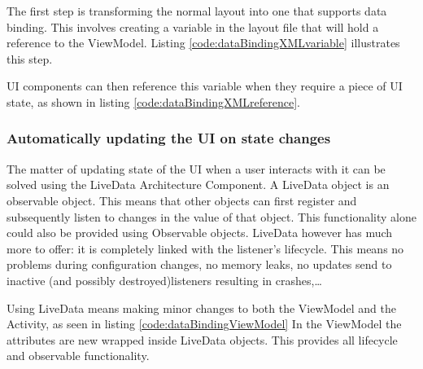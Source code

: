 The first step is transforming the normal layout into one that supports data binding.
This involves creating a variable in the layout file that will hold a reference to the ViewModel.
Listing \ref{code:dataBindingXMLvariable} illustrates this step.



UI components can then reference this variable when they require a piece of UI state, as shown in listing \ref{code:dataBindingXMLreference}.



\subsubsection{Automatically updating the UI on state changes}
The matter of updating state of the UI when a user interacts with it can be solved using the LiveData Architecture Component\cite{liveData}.
A LiveData object is an observable object.
This means that other objects can first register and subsequently listen to changes in the value of that object.
This functionality alone could also be provided using Observable objects\cite{observable}.
LiveData however has much more to offer: it is completely linked with the listener's lifecycle.
This means no problems during configuration changes, no memory leaks, no updates send to inactive (and possibly destroyed)listeners resulting in crashes,\ldots

Using LiveData means making minor changes to both the ViewModel and the Activity, as seen in listing \ref{code:dataBindingViewModel}
In the ViewModel the attributes are new wrapped inside LiveData objects.
This provides all lifecycle and observable functionality. 



